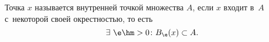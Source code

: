 
    Точка $x$ называется внутренней точкой множества $A$, если $x$ входит в~$A$  с~некоторой своей окрестностью, то есть
    \[ \exists\ \e\hm>0\colon B_\e(x)\subset A.\]
